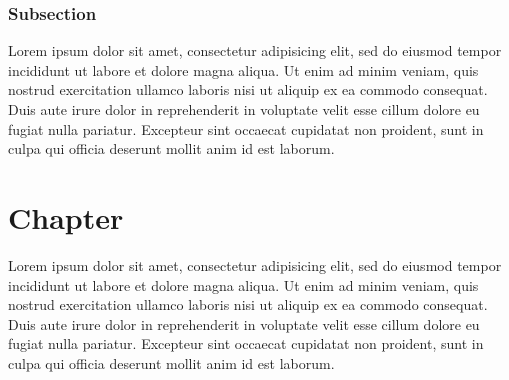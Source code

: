 \documentclass[a5paper, 10pt]{book}
\begin{document}
	\subsection{Subsection}

	Lorem ipsum dolor sit amet, consectetur adipisicing elit, sed do eiusmod tempor incididunt ut labore et dolore magna aliqua. Ut enim ad minim veniam, quis nostrud exercitation ullamco laboris nisi ut aliquip ex ea commodo consequat. Duis aute irure dolor in reprehenderit in voluptate velit esse cillum dolore eu fugiat nulla pariatur. Excepteur sint occaecat cupidatat non proident, sunt in culpa qui officia deserunt mollit anim id est laborum.

	\chapter{Chapter}

	Lorem ipsum dolor sit amet, consectetur adipisicing elit, sed do eiusmod tempor incididunt ut labore et dolore magna aliqua. Ut enim ad minim veniam, quis nostrud exercitation ullamco laboris nisi ut aliquip ex ea commodo consequat. Duis aute irure dolor in reprehenderit in voluptate velit esse cillum dolore eu fugiat nulla pariatur. Excepteur sint occaecat cupidatat non proident, sunt in culpa qui officia deserunt mollit anim id est laborum.






\end{document}
